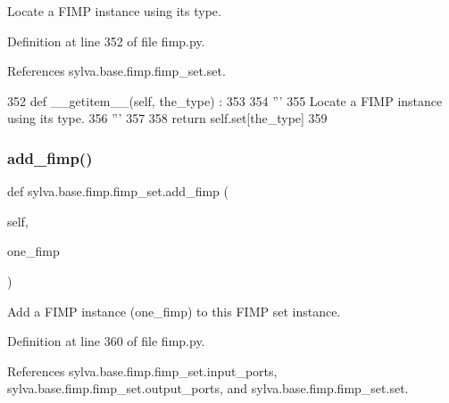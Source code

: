 \begin{DoxyVerb}  Locate a FIMP instance using its type.
\end{DoxyVerb}
 

Definition at line 352 of file fimp.\+py.



References sylva.\+base.\+fimp.\+fimp\+\_\+set.\+set.


\begin{DoxyCode}
352     \textcolor{keyword}{def }\_\_getitem\_\_(self, the\_type) :
353 
354       \textcolor{stringliteral}{'''}
355 \textcolor{stringliteral}{        Locate a FIMP instance using its type.}
356 \textcolor{stringliteral}{      '''}
357 
358       \textcolor{keywordflow}{return} self.set[the\_type]
359 
\end{DoxyCode}
\mbox{\label{classsylva_1_1base_1_1fimp_1_1fimp__set_ab613d0c639c54bec78bb31b9f983ba80}} 
\subsubsection{\texorpdfstring{add\+\_\+fimp()}{add\_fimp()}}
{\footnotesize\ttfamily def sylva.\+base.\+fimp.\+fimp\+\_\+set.\+add\+\_\+fimp (\begin{DoxyParamCaption}\item[{}]{self,  }\item[{}]{one\+\_\+fimp }\end{DoxyParamCaption})}

\begin{DoxyVerb}  Add a FIMP instance (one_fimp) to this FIMP set instance.
\end{DoxyVerb}
 

Definition at line 360 of file fimp.\+py.



References sylva.\+base.\+fimp.\+fimp\+\_\+set.\+input\+\_\+ports, sylva.\+base.\+fimp.\+fimp\+\_\+set.\+output\+\_\+ports, and sylva.\+base.\+fimp.\+fimp\+\_\+set.\+set.


